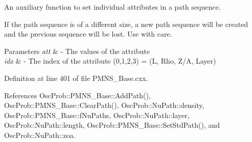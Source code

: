An auxiliary function to set individual attributes in a path sequence.

If the path sequence is of a different size, a new path sequence will be created and the previous sequence will be lost. Use with care.


\begin{DoxyParams}{Parameters}
{\em att} & -\/ The values of the attribute \\
\hline
{\em idx} & -\/ The index of the attribute (0,1,2,3) = (L, Rho, Z/A, Layer) \\
\hline
\end{DoxyParams}


Definition at line 401 of file P\+M\+N\+S\+\_\+\+Base.\+cxx.



References Osc\+Prob\+::\+P\+M\+N\+S\+\_\+\+Base\+::\+Add\+Path(), Osc\+Prob\+::\+P\+M\+N\+S\+\_\+\+Base\+::\+Clear\+Path(), Osc\+Prob\+::\+Nu\+Path\+::density, Osc\+Prob\+::\+P\+M\+N\+S\+\_\+\+Base\+::f\+Nu\+Paths, Osc\+Prob\+::\+Nu\+Path\+::layer, Osc\+Prob\+::\+Nu\+Path\+::length, Osc\+Prob\+::\+P\+M\+N\+S\+\_\+\+Base\+::\+Set\+Std\+Path(), and Osc\+Prob\+::\+Nu\+Path\+::zoa.


